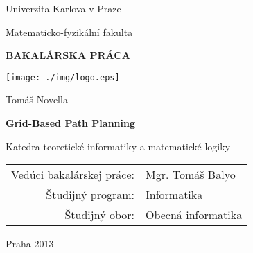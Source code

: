 \documentclass[12pt,a4paper]{report}
\begin{document}


\pagestyle{empty}
\begin{center}

\large

Univerzita Karlova v Praze

\medskip

Matematicko-fyzikální fakulta

\vfill

{\bf\Large BAKALÁRSKA PRÁCA}

\vfill

\centerline{\mbox{\texttt{[image: ./img/logo.eps]}}}

\vfill
\vspace{5mm}

{\LARGE Tomáš Novella}

\vspace{15mm}

{\LARGE\bfseries Grid-Based Path Planning}

\vfill

Katedra teoretické informatiky a matematické logiky

\vfill

\begin{tabular}{rl}

Vedúci bakalárskej práce: & Mgr. Tomáš Balyo \\
\noalign{\vspace{2mm}}
Študijný program: & Informatika \\
\noalign{\vspace{2mm}}
Študijný obor: & Obecná informatika \\
\end{tabular}

\vfill

Praha 2013

\end{center}

\newpage


\end{document}
